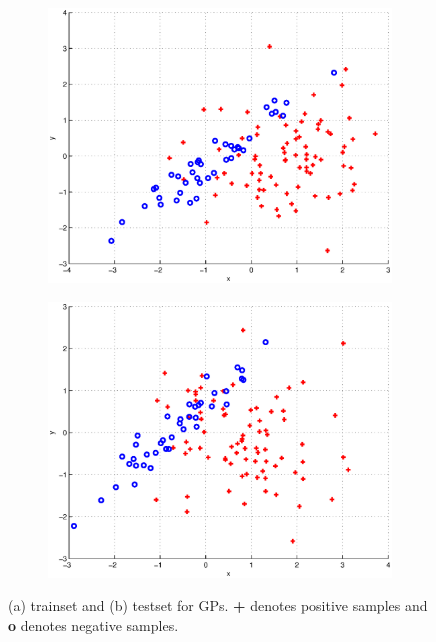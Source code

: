 \documentclass[journal, a4paper]{IEEEtran}
\begin{document}
    
    \begin{figure}[ht]      
      \begin{subfigure}{.22\textwidth}
	\centering
	\includegraphics[width=.9\linewidth]{GP_trainset}
	\caption{}
	\label{fig:GP_a}
      \end{subfigure}
      \begin{subfigure}{.22\textwidth}
	\centering
	\includegraphics[width=.9\linewidth]{GP_testset}
	\caption{}
	\label{fig:GP_b}
      \end{subfigure}    
    
      \caption{(a) trainset and (b) testset for GPs. \textbf{+} denotes positive samples and \textbf{o} denotes negative samples.}
      \label{fig:GP_data}      
    \end{figure}
\end{document}
